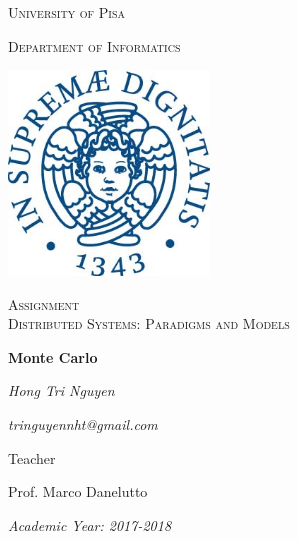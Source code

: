 \documentclass[14pt,a4paper]{report}
\begin{document}
	\begin{titlepage}
		\centering
		{\scshape\LARGE University of Pisa \par}
		{\scshape Department of Informatics\par}
		\vspace{1.0cm}
		\includegraphics[width=0.4\textwidth]{image/Unipi_Image}\par\vspace{1cm}
		
		\vspace{0.5cm}
		{\scshape\Large Assignment\\Distributed Systems: Paradigms and Models \par}
		\vspace{1.cm}
		{\huge\bfseries Monte Carlo\par}
		\vspace{2cm}
		{\Large\itshape Hong Tri Nguyen \par}
		{\Large\itshape tringuyennht@gmail.com\par}
		\vspace{2cm}

		\vfill
		Teacher\par
		Prof. Marco Danelutto
		\vfill
		{\Large\itshape Academic Year: 2017-2018\par}
		\vfill

	\end{titlepage}
\end{document}
